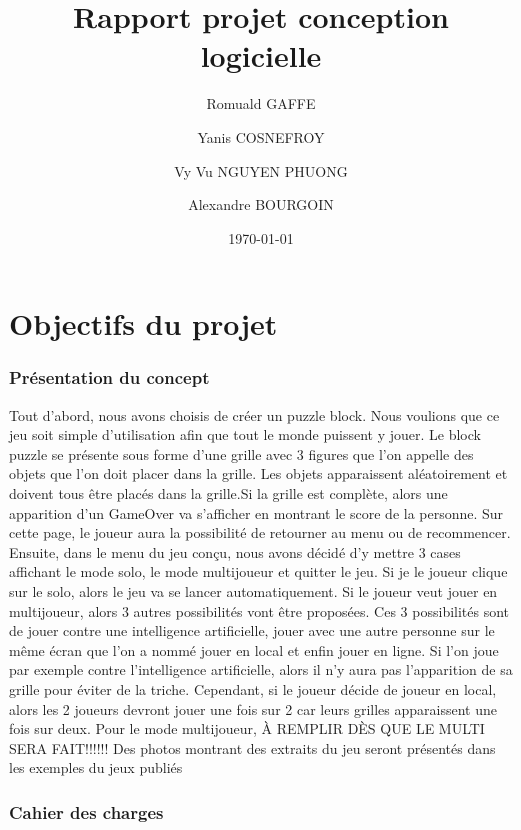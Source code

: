 \documentclass[]{report}
\title{Rapport projet conception logicielle}
\author{Romuald GAFFE\and Yanis COSNEFROY\and Vy Vu NGUYEN PHUONG\and Alexandre BOURGOIN}
\date{\today}
\begin{document}
\maketitle 
\tableofcontents
\part{Objectifs du projet}
\section{Présentation du concept}
Tout d'abord, nous avons choisis de créer un puzzle block. Nous voulions que ce jeu soit simple d'utilisation afin que tout le monde puissent y jouer. Le block puzzle se présente sous forme d'une grille avec 3 figures que l'on appelle des objets que l'on doit placer dans la grille. Les objets apparaissent aléatoirement et doivent tous être placés dans la grille.Si la grille est complète, alors une apparition d'un GameOver va s'afficher en montrant le score de la personne. Sur cette page, le joueur aura la possibilité de retourner au menu ou de recommencer. Ensuite, dans le menu du jeu conçu, nous avons décidé d'y mettre 3 cases affichant le mode solo, le mode multijoueur et quitter le jeu. Si je le joueur clique sur le solo, alors le jeu va se lancer automatiquement. Si le joueur veut jouer en multijoueur, alors 3 autres possibilités vont être proposées. Ces 3 possibilités sont de jouer contre une intelligence artificielle, jouer avec une autre personne sur le même écran que l'on a nommé jouer en local et enfin jouer en ligne. Si l'on joue par exemple contre l'intelligence artificielle, alors il n'y aura pas l'apparition de sa grille pour éviter de la triche. Cependant, si le joueur décide de joueur en local, alors les 2 joueurs devront jouer une fois sur 2 car leurs grilles apparaissent une fois sur deux. Pour le mode multijoueur, À REMPLIR DÈS QUE LE MULTI SERA FAIT!!!!!! Des photos montrant des extraits du jeu seront présentés dans les exemples du jeux publiés

\section{Cahier des charges}
\end{document}
